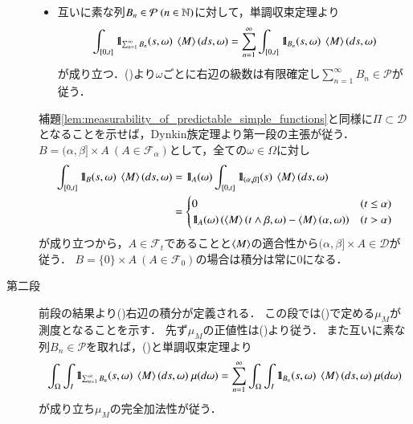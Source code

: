\begin{prf}
\begin{description}
\begin{itemize}
					\item 互いに素な列$B_n \in \mathcal{P}\ (n \in \mathbb{N})$に対して，単調収束定理より
						\begin{align}
							\int_{[0,t]} \defunc_{\sum_{n=1}^{\infty}B_n}(s,\omega)\ \inprod<M>(ds,\omega)
							= \sum_{n=1}^{\infty} \int_{[0,t]} \defunc_{B_n}(s,\omega)\ \inprod<M>(ds,\omega)
							\label{eq:thm_composition_of_predictable_space_measure_3}
						\end{align}
						が成り立つ．()より$\omega$ごとに右辺の級数は有限確定し$\sum_{n=1}^{\infty}B_n \in \mathcal{P}$が従う．
				\end{itemize}
				補題\ref{lem:measurability_of_predictable_simple_functions}と同様に$\Pi \subset \mathcal{D}$となることを示せば，Dynkin族定理より第一段の主張が従う．
				$B = (\alpha,\beta] \times A\ (A \in \mathcal{F}_\alpha)$として，全ての$\omega \in \Omega$に対し
				\begin{align}
					\int_{[0,t]} \defunc_B(s,\omega)\ \inprod<M>(ds,\omega)
					&= \defunc_A(\omega) \int_{[0,t]} \defunc_{(\alpha,\beta]}(s)\ \inprod<M>(ds,\omega) \\
					&= \begin{cases}
						0 & (t \leq \alpha) \\
						\defunc_A(\omega)\left( \inprod<M>(t \wedge \beta,\omega) - \inprod<M>(\alpha,\omega) \right) & (t > \alpha)
					\end{cases}
				\end{align}
				が成り立つから，$A \in \mathcal{F}_t$であることと$\inprod<M>$の適合性から$(\alpha,\beta] \times A \in \mathcal{D}$が従う．
				$B = \{0\} \times A\ (A \in \mathcal{F}_0)$の場合は積分は常に0になる．
				
			\item[第二段]
				前段の結果より()右辺の積分が定義される．
				この段では()で定める$\mu_M$が測度となることを示す．
				先ず$\mu_M$の正値性は()より従う．
				また互いに素な列$B_n \in \mathcal{P}$を取れば，()と単調収束定理より
				\begin{align}
					\int_\Omega \int_I \defunc_{\sum_{n=1}^{\infty}B_n}(s,\omega)\ \inprod<M>(ds,\omega)\ \mu(d\omega)
					= \sum_{n=1}^{\infty} \int_\Omega \int_I \defunc_{B_n}(s,\omega)\ \inprod<M>(ds,\omega)\ \mu(d\omega)
				\end{align}
				が成り立ち$\mu_M$の完全加法性が従う．
				\QED
		\end{description}
	\end{prf}
	
